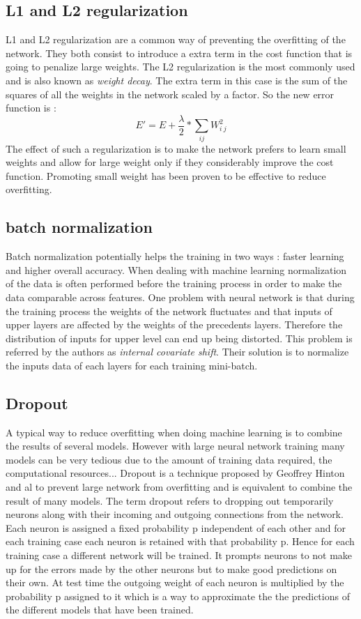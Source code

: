   \subsection{L1 and L2 regularization}

  L1 and L2 regularization are a common way of preventing the overfitting of the network. They both consist to introduce a extra term in the cost function that is going to penalize large weights. The L2 regularization is the most commonly used and is also known as \textit{weight decay}. The extra term in this case is the sum of the squares of all the weights in the network scaled by a factor. So the new error function is : \[ E' = E + \dfrac{\lambda}{2}*\sum_{ij}W^2_i_j \] The effect of such a regularization is to make the network prefers to learn small weights and allow for large weight only if they considerably improve the cost function. Promoting small weight has been proven to be effective to reduce overfitting.

  \subsection{batch normalization}
  Batch normalization \cite{ioffe2015batch} potentially helps the training in two ways : faster learning and higher overall accuracy. When dealing with machine learning normalization of the data is often performed before the training process in order to make the data comparable across features. One problem with neural network is that during the training process the weights of the network fluctuates and that inputs of upper layers are affected by the weights of the precedents layers. Therefore the distribution of inputs for upper level can end up being distorted. This problem is referred by the authors as \textit{internal covariate shift}. Their solution is to normalize the inputs data of each layers for each training mini-batch.

  \subsection{Dropout}
  A typical way to reduce overfitting when doing machine learning is to combine the results of several models. However with large neural network training many models can be very tedious due to the amount of training data required, the computational resources... Dropout is a technique proposed by Geoffrey Hinton and al \cite{hinton2012improving} \cite{srivastava2014dropout} to prevent large network from overfitting and is equivalent to combine the result of many models. The term dropout refers to dropping out temporarily neurons along with their incoming and outgoing connections from the network. Each neuron is assigned a fixed probability p independent of each other and for each training case each neuron is retained with that probability p. Hence for each training case a different network will be trained. It prompts neurons to not make up for the errors made by the other neurons but to make good predictions on their own. At test time the outgoing weight of each neuron is multiplied by the probability p assigned to it which is a way to approximate the the predictions of the different models that have been trained.

